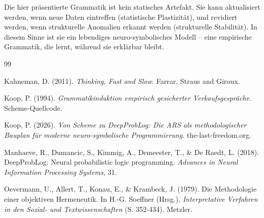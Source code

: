 \documentclass[12pt,a4paper]{article}
\begin{document}
Die hier präsentierte Grammatik ist kein statisches Artefakt. Sie kann
aktualisiert werden, wenn neue Daten eintreffen (statistische Plastizität),
und revidiert werden, wenn strukturelle Anomalien erkannt werden (strukturelle
Stabilität). In diesem Sinne ist sie ein lebendiges neuro-symbolisches Modell –
eine empirische Grammatik, die lernt, während sie erklärbar bleibt.

\newpage
\begin{thebibliography}{99}

Kahneman, D. (2011). \textit{Thinking, Fast and Slow}. Farrar, Straus and Giroux.

Koop, P. (1994). \textit{Grammatikinduktion empirisch gesicherter 
Verkaufsgespräche}. Scheme-Quellcode.

Koop, P. (2026). \textit{Von Scheme zu DeepProbLog: Die ARS als methodologischer
Bauplan für moderne neuro-symbolische Programmierung}. the-last-freedom.org.

Manhaeve, R., Dumancic, S., Kimmig, A., Demeester, T., \& De Raedt, L. (2018).
DeepProbLog: Neural probabilistic logic programming. \textit{Advances in
Neural Information Processing Systems}, 31.

Oevermann, U., Allert, T., Konau, E., \& Krambeck, J. (1979). Die Methodologie
einer objektiven Hermeneutik. In H.-G. Soeffner (Hrsg.), \textit{Interpretative
Verfahren in den Sozial- und Textwissenschaften} (S. 352-434). Metzler.

\end{thebibliography}
\end{document}

